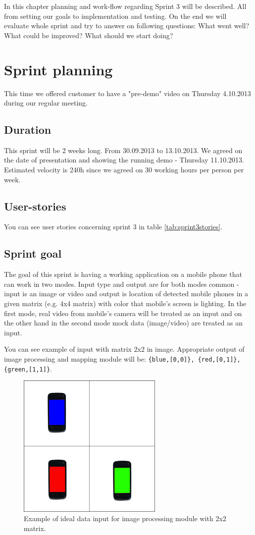 In this chapter planning and work-flow regarding Sprint 3 will be described. 
All from setting our goals to implementation and testing. On the end we will evaluate whole sprint and try to answer on following questions: What went well? What could be improved? What should we start doing?  

\section{Sprint planning}

This time we offered customer to have a "pre-demo" video on Thursday 4.10.2013 during our regular meeting.
\subsection{Duration}
This sprint will be 2 weeks long. From 30.09.2013 to 13.10.2013.
We agreed on the date of presentation and showing the running demo - Thursday 11.10.2013.
Estimated velocity is 240h since we agreed on 30 working hours per person per week.

\subsection{User-stories}
You can see user stories concerning sprint 3 in table \ref{tab:sprint3stories}.
\subsection{Sprint goal}
The goal of this sprint is having a working application on a mobile phone that can work in two modes.  
Input type and output are for both modes common - input is an image or video and output is location of detected mobile phones in a given matrix (e.g. 4x4 matrix) with color that mobile's screen is lighting.
In the first mode, real video from mobile's camera will be treated as an input and on the other hand in the second mode mock data (image/video) are treated as an input.

You can see example of input with matrix 2x2 in image. Appropriate output of image processing and mapping module will be: \texttt{\{blue,[0,0]\}, \{red,[0,1]\}, \{green,[1,1]\}}.

\begin{figure}[H]
	\centering
		\includegraphics[width=7cm]{sprint3/sprint3_goal.jpg}
	\caption{Example of ideal data input for image processing module with 2x2 matrix.}
	\label{img:sprint3_goal}
\end{figure}

